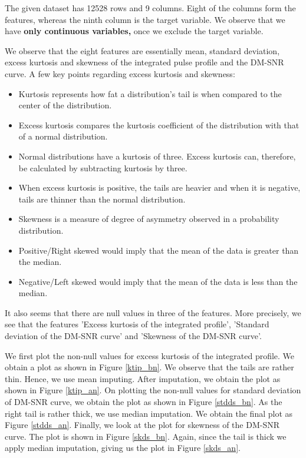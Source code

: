 \documentclass[conference]{IEEEtran}
\begin{document}
The given dataset has 12528 rows and 9 columns. Eight of the columns form the features, whereas the ninth column is the target variable. We observe that we have \textbf{only continuous variables,} once we exclude the target variable.  

We observe that the eight features are essentially mean, standard deviation, excess kurtosis and skewness of the integrated pulse profile and the DM-SNR curve. A few key points regarding excess kurtosis and skewness:

\begin{itemize}
    \item Kurtosis represents how fat a distribution's tail is when compared to the center of the distribution. 
    \item Excess kurtosis compares the kurtosis coefficient of the distribution with that of a normal distribution. 
    \item Normal distributions have a kurtosis of three. Excess kurtosis can, therefore, be calculated by subtracting kurtosis by three. 
    \item When excess kurtosis is positive, the tails are heavier and when it is negative, tails are thinner than the normal distribution.
    \item Skewness is a measure of degree of asymmetry observed in a probability distribution.
    \item Positive/Right skewed would imply that the mean of the data is greater than the median.
    \item Negative/Left skewed would imply that the mean of the data is less than the median.
\end{itemize}

It also seems that there are null values in three of the features. More precisely, we see that the features 'Excess kurtosis of the integrated profile', 'Standard deviation of the DM-SNR curve' and 'Skewness of the DM-SNR curve'. 

We first plot the non-null values for excess kurtosis of the integrated profile. We obtain a plot as shown in Figure \ref{ktip_bn}. We observe that the tails are rather thin. Hence, we use mean imputing. After imputation, we obtain the plot as shown in Figure \ref{ktip_an}. On plotting the non-null values for standard deviation of DM-SNR curve, we obtain the plot as shown in Figure \ref{stdds_bn}. As the right tail is rather thick, we use median imputation. We obtain the final plot as Figure \ref{stdds_an}. Finally, we look at the plot for skewness of the DM-SNR curve. The plot is shown in Figure \ref{skds_bn}. Again, since the tail is thick we apply median imputation, giving us the plot in Figure \ref{skds_an}.
\end{document}
